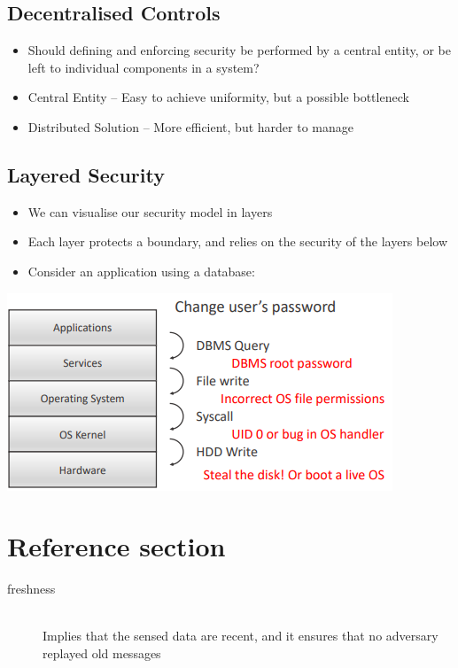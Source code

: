 \documentclass{article}
\begin{document}
\subsection{Decentralised Controls}
\begin{itemize}
  \item Should defining and enforcing security be performed by a central entity, or be left to individual components in a system?
  \item Central Entity – Easy to achieve uniformity, but a possible bottleneck 
  \item Distributed Solution – More efficient, but harder to manage
\end{itemize}

\subsection{Layered Security}
\begin{itemize}
  \item We can visualise our security model in layers 
  \item Each layer protects a boundary, and relies on the security of the layers below
  \item Consider an application using a database:
\end{itemize}
\begin{center}
  \includegraphics[scale=0.5]{layer_security.png}
\end{center}

\pagebreak
\section*{Reference section} \label{sec:reference}
\begin{description}
	\item[freshness] \hfill \\ Implies that the sensed data are recent, and it ensures that no adversary replayed old messages
\end{description}
\end{document}
